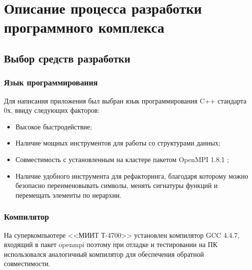\documentclass[a4paper,fontsize=14bp]{article}
\begin{document}
\section{Описание процесса разработки программного комплекса}
  \subsection{Выбор средств разработки}

    \subsubsection{Язык программирования} 
      Для написания приложения был выбран язык программирования C++ стандарта 0х, 
      ввиду следующих факторов:  
      \begin{itemize}
        \item Высокое быстродействие;
        \item Наличие мощных инструментов для работы со структурами данных;
        \item Совместимость с установленным на кластере пакетом OpenMPI 1.8.1 \cite{cluster:varf};
        \item Наличие удобного инструмента для рефакторинга, благодаря которому можно безопасно
        переименовывать символы, менять сигнатуры функций и перемещать элементы по иерархии.
      \end{itemize}

    \subsubsection{Компилятор}  
      На суперкомпьютере <<МИИТ Т-4700>> установлен компилятор GCC 4.4.7, входящий в пакет 
      openmpi поэтому при отладке и тестировании на ПК использовался аналогичный компилятор 
      для обеспечения обратной совместимости. 
\end{document}
